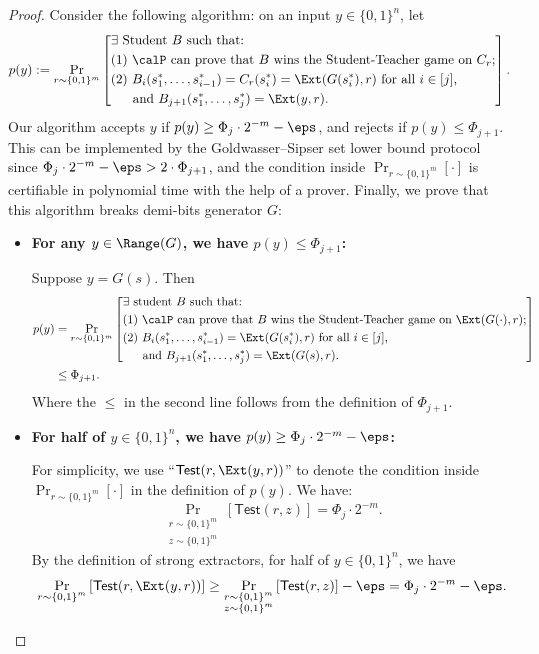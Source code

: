 \begin{proof}
    Consider the following algorithm: on an input $y\in\{0,1\}^n$, let
    \[
        p(y):=\Pr_{r\sim\{0,1\}^m}\left[\begin{aligned}
            &\text{$\exists$ Student $B$ such that:}\\
            &\text{(1) $\calP$ can prove that $B$ wins the Student-Teacher game on $C_r$;}\\
            &\text{(2) $B_i(s_1^*,\dots,s_{i-1}^*)=C_r(s_i^*) = \Ext(G(s_{i}^*),r)$ for all $i\in[j]$,}\\
            &\text{~~~~~and $B_{j+1}(s_1^*,\dots,s_j^*)=\Ext(y,r)$.}
        \end{aligned}\right].
    \]
    Our algorithm accepts $y$ if $p(y)\geq\Phi_j\cdot2^{-m}-\eps$, and rejects if $p(y)\leq\Phi_{j+1}$. This can be implemented by the Goldwasser--Sipser set lower bound protocol since $\Phi_j\cdot2^{-m}-\eps>2\cdot\Phi_{j+1}$, and the condition inside $\Pr_{r\sim\{0,1\}^m}[\cdot]$ is certifiable in polynomial time with the help of a prover. Finally, we prove that this algorithm breaks demi-bits generator $G$:
    \begin{itemize}
        \item {\bf For any $y\in \Range(G)$, we have $p(y)\leq\Phi_{j+1}$:}\par
        Suppose $y=G(s)$. Then
        \begin{align*}
            p(y)&=\Pr_{r\sim\{0,1\}^m}\left[\begin{aligned}
                &\text{$\exists$ student $B$ such that:}\\
                &\text{(1) $\calP$ can prove that $B$ wins the Student-Teacher game on $\Ext(G(\cdot),r)$;}\\
                &\text{(2) $B_i(s_1^*,\dots,s_{i-1}^*)=\Ext(G(s_{i}^*),r)$ for all $i\in[j]$,}\\
                &\text{~~~~~and $B_{j+1}(s_1^*,\dots,s_j^*)=\Ext(G(s),r)$.}
            \end{aligned}\right]\\
            &\leq\Phi_{j+1}.
        \end{align*}
        Where the $\leq$ in the second line follows from the definition of $\Phi_{j+1}$.
        \item {\bf For half of $y\in \{0,1\}^n$, we have $p(y)\geq\Phi_j\cdot2^{-m}-\eps$:}\par
        For simplicity, we use ``$\mathsf{Test}(r,\Ext(y,r))$'' to denote the condition inside $\Pr_{r\sim\{0,1\}^m}[\cdot]$ in the definition of $p(y)$. We have:
        \[
            \Pr_{\substack{r\sim\{0,1\}^m\\z\sim\{0,1\}^m}}\left[\mathsf{Test}(r,z)\right]=\Phi_j\cdot 2^{-m}.
        \]
        By the definition of strong extractors, for half of $y\in\{0,1\}^n$, we have
        \[
            \Pr_{\substack{r\sim\{0,1\}^m}}\left[\mathsf{Test}(r,\Ext(y,r))\right]\geq\Pr_{\substack{r\sim\{0,1\}^m\\z\sim\{0,1\}^m}}\left[\mathsf{Test}(r,z)\right]-\eps=\Phi_j\cdot 2^{-m}-\eps.\qedhere
        \]
    \end{itemize}
\end{proof}

